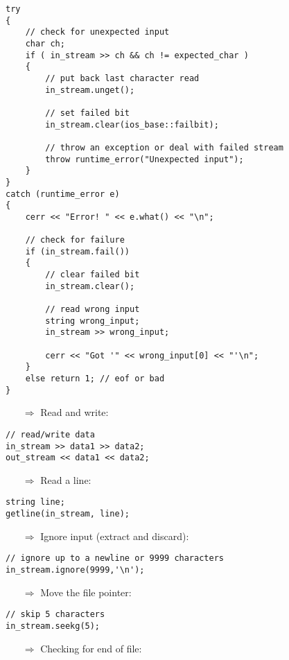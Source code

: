 \documentclass[10pt]{article}
\begin{document}
\begin{lstlisting}
try
{
    // check for unexpected input
    char ch;
    if ( in_stream >> ch && ch != expected_char )
    {
        // put back last character read
        in_stream.unget();
        
        // set failed bit
        in_stream.clear(ios_base::failbit);
    
        // throw an exception or deal with failed stream
        throw runtime_error("Unexpected input");
    }
}
catch (runtime_error e)
{
    cerr << "Error! " << e.what() << "\n";
            
    // check for failure
    if (in_stream.fail())
    {
        // clear failed bit
        in_stream.clear();
                
        // read wrong input
        string wrong_input;
        in_stream >> wrong_input;
                    
        cerr << "Got '" << wrong_input[0] << "'\n";
    }
    else return 1; // eof or bad
}
\end{lstlisting}
\begin{enumerate}
\item[$\Rightarrow$] Read and write:
\end{enumerate}
\begin{lstlisting}
// read/write data
in_stream >> data1 >> data2;
out_stream << data1 << data2;
\end{lstlisting}
\begin{enumerate}
\item[$\Rightarrow$] Read a line:
\end{enumerate}
\begin{lstlisting}
string line;
getline(in_stream, line);
\end{lstlisting}
\begin{enumerate}
\item[$\Rightarrow$] Ignore input (extract and discard):
\end{enumerate}
\begin{lstlisting}
// ignore up to a newline or 9999 characters
in_stream.ignore(9999,'\n');
\end{lstlisting}
\begin{enumerate}
\item[$\Rightarrow$] Move the file pointer:
\end{enumerate}
\begin{lstlisting}
// skip 5 characters
in_stream.seekg(5);
\end{lstlisting}
\begin{enumerate}
\item[$\Rightarrow$] Checking for end of file:
\end{enumerate}
\end{document}
